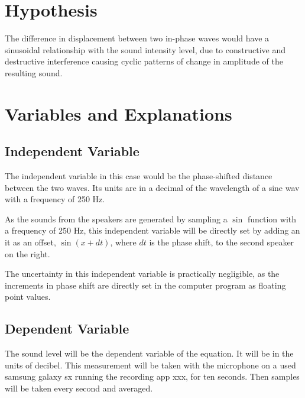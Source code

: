 \documentclass[index]{subfiles}
\begin{document}
\section{Hypothesis}

The difference in displacement between two in-phase waves would have a sinusoidal relationship with the sound intensity level, due to constructive and destructive interference causing cyclic patterns of change in amplitude of the resulting sound.




\section{Variables and Explanations}

\subsection{Independent Variable}

The independent variable in this case would be the phase-shifted distance between the two waves. Its units are in a decimal of the wavelength of a sine wav with a frequency of 250 Hz.

As the sounds from the speakers are generated by sampling a \(\sin\) function with a frequency of 250 Hz, this independent variable will be directly set by adding an it as an offset, \(\sin(x + dt)\), where \(dt\) is the phase shift, to the second speaker on the right.

The uncertainty in this independent variable is practically negligible, as the increments in phase shift are directly set in the computer program as floating point values.

\subsection{Dependent Variable}

The sound level will be the dependent variable of the equation. It will be in the units of decibel. This measurement will be taken with the microphone on a used samsung galaxy sx running the recording app xxx, for ten seconds. Then samples will be taken every second and averaged.
\end{document}
